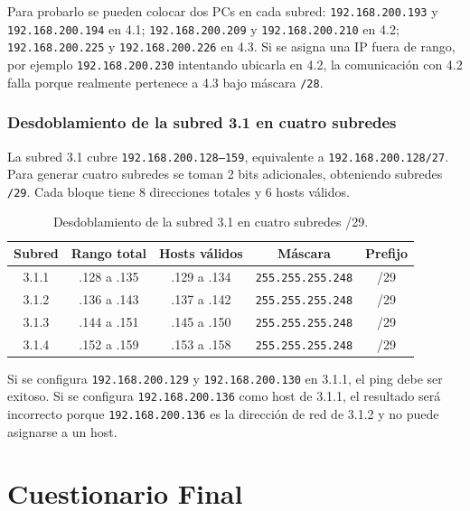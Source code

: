 \documentclass[a4paper,12pt]{article}
\newcommand{\ip}[1]{\mbox{\texttt{#1}}}
\begin{document}
Para probarlo se pueden colocar dos PCs en cada subred: \ip{192.168.200.193} y \ip{192.168.200.194} en 4.1; \ip{192.168.200.209} y \ip{192.168.200.210} en 4.2; \ip{192.168.200.225} y \ip{192.168.200.226} en 4.3. Si se asigna una IP fuera de rango, por ejemplo \ip{192.168.200.230} intentando ubicarla en 4.2, la comunicación con 4.2 falla porque realmente pertenece a 4.3 bajo máscara \ip{/28}.



\subsubsection{Desdoblamiento de la subred 3.1 en cuatro subredes}

La subred 3.1 cubre \ip{192.168.200.128--159}, equivalente a \ip{192.168.200.128/27}. Para generar cuatro subredes se toman 2 bits adicionales, obteniendo subredes \ip{/29}. Cada bloque tiene 8 direcciones totales y 6 hosts válidos.

\begin{table}[H]
\centering
\small
\begin{tabular}{|c|c|c|c|c|}
\hline
Subred & Rango total & Hosts válidos & Máscara & Prefijo \\
\hline
3.1.1 & .128 a .135 & .129 a .134 & \ip{255.255.255.248} & /29 \\
3.1.2 & .136 a .143 & .137 a .142 & \ip{255.255.255.248} & /29 \\
3.1.3 & .144 a .151 & .145 a .150 & \ip{255.255.255.248} & /29 \\
3.1.4 & .152 a .159 & .153 a .158 & \ip{255.255.255.248} & /29 \\
\hline
\end{tabular}
\caption{Desdoblamiento de la subred 3.1 en cuatro subredes /29.}
\end{table}

Si se configura \ip{192.168.200.129} y \ip{192.168.200.130} en 3.1.1, el ping debe ser exitoso. Si se configura \ip{192.168.200.136} como host de 3.1.1, el resultado será incorrecto porque \ip{192.168.200.136} es la dirección de red de 3.1.2 y no puede asignarse a un host.



\section{Cuestionario Final}
\end{document}
